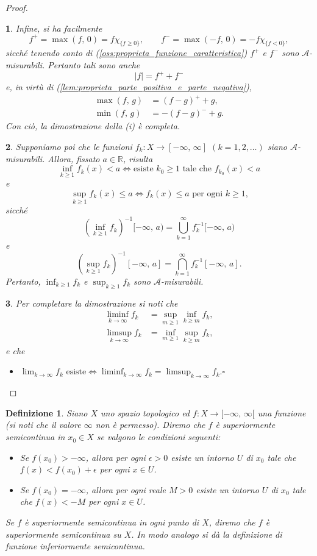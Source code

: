 \documentclass[a4paper,10pt,openright,oneside]{book}
\theoremstyle{theoremstyle}
\theoremstyle{theoremstylewoheader}
\theoremstyle{theoremstyle}
\newtheorem{definizione}[teorema]{Definizione}
\theoremstyle{proofsecstyle}
\newtheorem{proofsec}{}
\theoremstyle{nonumberplain}
\newtheorem{proof}{Dim.}
\renewcommand{\AA}{\ensuremath{\mathcal{A}}}
\newcommand{\RR}{\ensuremath{\mathbb{R}}}
\newcommand{\abs}[1]{\ensuremath{\lvert #1 \rvert}}
\renewcommand{\qedsymbol}{\ensuremath{\square}}
\newcommand{\mymath}[2]{\begin{itemize}%
  \item[]\hfill\hbox{}\ensuremath{\displaystyle #1}\hfill\ensuremath{\displaystyle #2}%
  \end{itemize}}
\begin{document}
\begin{proof}
\begin{proofsec}
Infine, si ha facilmente
\[
f^+ = \max(f,\, 0) = f\chi_{\{f \ge 0\}},\qquad f^- = \max(-f,\, 0) = -f\chi_{\{f < 0\}},
\]
sicché tenendo conto di (\ref{oss:proprieta_funzione_caratteristica}) $f^+$ e $f^-$ sono $\AA$-misurabili. Pertanto tali sono anche
\[
\abs{f} = f^+ + f^-
\]
e, in virtù di (\ref{lem:proprieta_parte_positiva_e_parte_negativa}),
\begin{align*}
\max(f,\, g) &= (f - g)^+ + g,\\
\min(f,\, g) &= -(f - g)^- + g.
\end{align*}
Con ciò, la dimostrazione della (i) è completa.
\end{proofsec}

\begin{proofsec}
Supponiamo poi che le funzioni $f_k : X \rightarrow [-\infty,\, \infty]$ $(k = 1, 2, \ldots)$ siano $\AA$-misurabili. Allora, fissato $a \in \RR$, risulta
\[
\inf_{k \ge 1} f_k(x) < a \iff \text{esiste $k_0 \ge 1$ tale che $f_{k_0}(x) < a$}
\]
e
\[
\sup_{k \ge 1} f_k(x) \le a \iff \text{$f_k(x) \le a$ per ogni $k \ge 1$,}
\]
sicché
\[
\left(\inf_{k \ge 1} f_k\right)^{-1} [-\infty,\, a) = \bigcup_{k=1}^\infty f_k^{-1} [-\infty,\, a)
\]
e
\[
\left(\sup_{k \ge 1} f_k\right)^{-1} [-\infty,\, a] = \bigcap_{k=1}^\infty f_k^{-1} [-\infty,\, a].
\]
Pertanto, $\inf_{k \ge 1} f_k$ e $\sup_{k \ge 1} f_k$ sono $\AA$-misurabili.
\end{proofsec}

\begin{proofsec}
Per completare la dimostrazione si noti che
\begin{align*}
\liminf_{k \to \infty} f_k &= \sup_{m \ge 1} \inf_{k \ge m} f_k,\\
\limsup_{k \to \infty} f_k &= \inf_{m \ge 1} \sup_{k \ge m} f_k,
\end{align*}
e che
\mymath{\lim_{k \to \infty} f_k \text{ esiste} \iff \liminf_{k \to \infty} f_k = \limsup_{k \to \infty} f_k.}{\qedsymbol}
\end{proofsec}
\end{proof}

\begin{definizione}
Siano $X$ uno spazio topologico ed $f : X \rightarrow [-\infty,\, \infty[$ una funzione (si noti che il valore $\infty$ non è permesso). Diremo che $f$ è \emph{superiormente semicontinua} in $x_0 \in X$ se valgono le condizioni seguenti:
\begin{itemize}
\item[($\alpha$)] Se $f(x_0) > -\infty$, allora per ogni $\epsilon > 0$ esiste un intorno $U$ di $x_0$ tale che $f(x) < f(x_0) + \epsilon$ per ogni $x \in U$.
\item[($\beta$)] Se $f(x_0) = -\infty$, allora per ogni reale $M > 0$ esiste un intorno $U$ di $x_0$ tale che $f(x) < -M$ per ogni $x \in U$.
\end{itemize}
Se $f$ è superiormente semicontinua in ogni punto di $X$, diremo che $f$ è superiormente semicontinua su $X$. In modo analogo si dà la definizione di funzione \emph{inferiormente semicontinua}.
\end{definizione}
\end{document}
